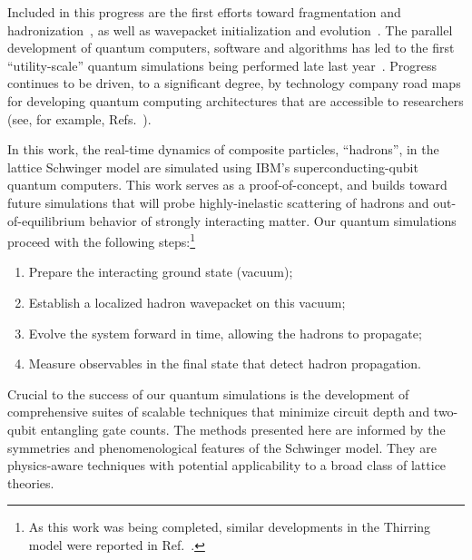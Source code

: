 \documentclass[aps, prc, tightenlines,superscriptaddress, letterpaper, amsmath, amssymb, preprintnumbers, floatfix, longbibliography, nofootinbib]{revtex4-2}
\begin{document}
Included in this progress are the first efforts toward fragmentation and hadronization~\cite{Bauer:2021gup,Florio:2023dke}, as well as wavepacket initialization and evolution~\cite{Kuhn:2015zqa,Pichler:2015yqa,Damme:2019rts,Avkhadiev:2019niu,Surace:2020ycc,Karpov:2020pqe,Milsted:2020jmf,Vovrosh:2022bpj,Asaduzzaman:2022bpi,Avkhadiev:2022ttx,Farrell:2022vyh,Atas:2022dqm,Vary:2023ihk,Chai:2023qpq,Belyansky:2023rgh}.
The parallel development of quantum computers, software and algorithms has led to the first ``utility-scale'' quantum simulations being performed late last year~\cite{Yu:2022ivm,Kim:2023bwr,Shtanko:2023tjn,Farrell:2023fgd,Baumer:2023vrf,Chen:2023tfg,Liao:2023eug,Bluvstein:2023zmt,Chowdhury:2023vbk}.
Progress continues to be driven, to a significant degree, by technology company road maps for developing quantum computing architectures that are accessible to researchers (see, for example, Refs.~\cite{ibmweb,quantinuumweb,ionqweb,queraweb}).

In this work, the real-time dynamics of composite particles, ``hadrons'', in the lattice Schwinger model are simulated using IBM's superconducting-qubit quantum computers. 
This work serves as a proof-of-concept, and builds toward future simulations that will probe highly-inelastic scattering of hadrons and out-of-equilibrium behavior of strongly interacting matter.
Our quantum simulations proceed with the following steps:\footnote{As this work was being completed, similar developments in the Thirring model were reported in Ref.~\cite{Chai:2023qpq}.}
%
\begin{enumerate}
    \item Prepare the interacting ground state (vacuum);
    \item Establish a localized hadron wavepacket on this vacuum;
    \item Evolve the system forward in time, allowing the hadrons to propagate;
    \item Measure observables in the final state that detect hadron propagation.
\end{enumerate}
%
Crucial to the success of our quantum simulations is the development of comprehensive suites of scalable techniques that minimize circuit depth and two-qubit entangling gate counts. 
The methods presented here are informed by the symmetries and phenomenological features of the Schwinger model.
They are physics-aware techniques with potential applicability to a broad class of lattice theories.
\end{document}
